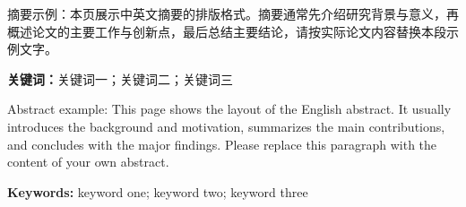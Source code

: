 \cleardoublepage
{}

摘要示例：本页展示中英文摘要的排版格式。摘要通常先介绍研究背景与意义，再概述论文的主要工作与创新点，最后总结主要结论，请按实际论文内容替换本段示例文字。

\vspace{2em}
\noindent\textbf{关键词：}关键词一；关键词二；关键词三

\cleardoublepage
{}

Abstract example: This page shows the layout of the English abstract. It usually introduces the background and motivation, summarizes the main contributions, and concludes with the major findings. Please replace this paragraph with the content of your own abstract.

\vspace{2em}
\noindent\textbf{Keywords: }keyword one; keyword two; keyword three
